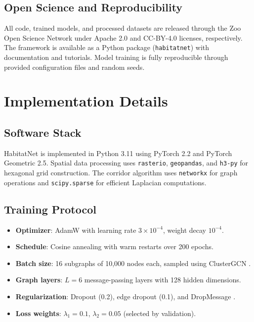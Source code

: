 \documentclass[11pt,a4paper]{article}
\begin{document}
\subsection{Open Science and Reproducibility}

All code, trained models, and processed datasets are released through the
Zoo Open Science Network under Apache 2.0 and CC-BY-4.0 licenses,
respectively. The framework is available as a Python package
(\texttt{habitatnet}) with documentation and tutorials. Model training is
fully reproducible through provided configuration files and random seeds.


\section{Implementation Details}
\label{sec:implementation}

\subsection{Software Stack}

HabitatNet is implemented in Python 3.11 using PyTorch 2.2 and PyTorch
Geometric 2.5. Spatial data processing uses \texttt{rasterio},
\texttt{geopandas}, and \texttt{h3-py} for hexagonal grid construction.
The corridor algorithm uses \texttt{networkx} for graph operations and
\texttt{scipy.sparse} for efficient Laplacian computations.

\subsection{Training Protocol}

\begin{itemize}
  \item \textbf{Optimizer}: AdamW with learning rate $3 \times 10^{-4}$,
    weight decay $10^{-4}$.
  \item \textbf{Schedule}: Cosine annealing with warm restarts over 200
    epochs.
  \item \textbf{Batch size}: 16 subgraphs of 10{,}000 nodes each,
    sampled using ClusterGCN \citep{chiang2019cluster}.
  \item \textbf{Graph layers}: $L = 6$ message-passing layers with 128
    hidden dimensions.
  \item \textbf{Regularization}: Dropout (0.2), edge dropout (0.1),
    and DropMessage \citep{fang2023dropmessage}.
  \item \textbf{Loss weights}: $\lambda_1 = 0.1$, $\lambda_2 = 0.05$
    (selected by validation).
\end{itemize}
\end{document}
